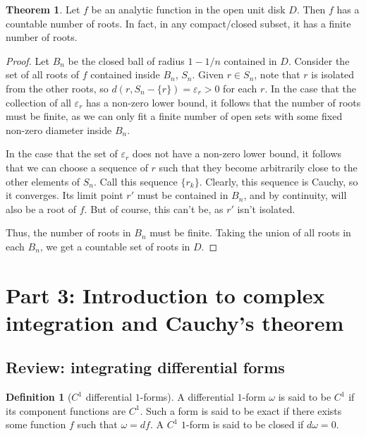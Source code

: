 \documentclass[aps,pra,showpacs,notitlepage,onecolumn,superscriptaddress,nofootinbib]{revtex4-1}
\theoremstyle{definition}
\newtheorem{definition}{Definition}[section]
\newtheorem{theorem}{Theorem}[section]
\begin{document}
\begin{theorem}
  Let $f$ be an analytic function in the open unit disk $D$. Then $f$ has a countable number of roots. In fact, in any compact/closed subset, it has a finite number of roots.
\end{theorem}
\begin{proof}
  Let $B_n$ be the closed ball of radius $1 - 1/n$ contained in $D$. Consider the set of all roots of $f$ contained inside $B_n$, $S_n$. Given $r \in S_n$, note that
  $r$ is isolated from the other roots, so $d(r, S_n - \{r\}) = \varepsilon_r > 0$ for each $r$. In the case that the collection of all $\varepsilon_r$ has a non-zero
  lower bound, it follows that the number of roots must be finite, as we can only fit a finite number of open sets with some fixed non-zero diameter inside $B_n$.
  \newline

  \noindent In the case that the set of $\varepsilon_r$ does not have a non-zero lower bound, it follows that we can choose a sequence of $r$ such that
  they become arbitrarily close to the other elements of $S_n$. Call this sequence $\{r_k\}$. Clearly, this sequence is Cauchy, so it converges. Its limit
  point $r'$ must be contained in $B_n$, and by continuity, will also be a root of $f$. But of course, this can't be, as $r'$ isn't isolated.
  \newline

  \noindent Thus, the number of roots in $B_n$ must be finite. Taking the union of all roots in each $B_n$, we get a countable set of roots in $D$.
\end{proof}

\section{Part 3: Introduction to complex integration and Cauchy's theorem}

\subsection{Review: integrating differential forms}

\begin{definition}[$C^1$ differential $1$-forms]
  A differential $1$-form $\omega$ is said to be $C^1$ if its component functions are $C^1$. Such a form is said to be exact if there exists
  some function $f$ such that $\omega = df$. A $C^1$ $1$-form is said to be closed if $d\omega = 0$.
\end{definition}
\end{document}

